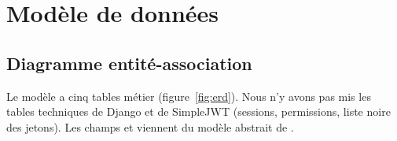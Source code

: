 \section{Modèle de données}
\label{sec:modele}

\subsection{Diagramme entité-association}

Le modèle a cinq tables métier (figure~\ref{fig:erd}). Nous n'y avons pas mis les tables techniques de Django et de SimpleJWT (sessions, permissions, liste noire des jetons). Les champs  et  viennent du modèle abstrait  de .

